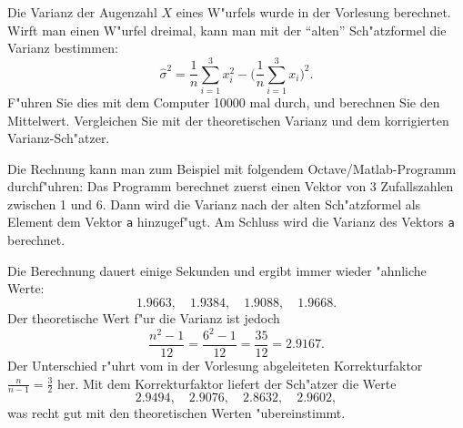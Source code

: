 Die Varianz der Augenzahl $X$ eines W"urfels wurde in der Vorlesung
berechnet. Wirft man einen W"urfel dreimal, kann man mit der
``alten'' Sch"atzformel die Varianz bestimmen:
\[
\hat\sigma^2=\frac1n\sum_{i=1}^3x_i^2-\biggl(\frac1n\sum_{i=1}^3x_i\biggr)^2.
\]
F"uhren Sie dies mit dem Computer 10000 mal durch, und berechnen Sie den
Mittelwert. Vergleichen Sie mit der theoretischen Varianz und dem
korrigierten Varianz-Sch"atzer.

\begin{loesung}
Die Rechnung kann man zum Beispiel mit folgendem Octave/Matlab-Programm
durchf"uhren:
Das Programm berechnet zuerst einen Vektor von 3 Zufallszahlen zwischen 1
und 6. Dann wird die Varianz nach der alten Sch"atzformel als Element
dem Vektor {\tt a} hinzugef"ugt. Am Schluss wird die Varianz des Vektors
{\tt a} berechnet.

Die Berechnung dauert einige Sekunden und ergibt immer wieder
"ahnliche Werte:
\[
1.9663,\quad 
1.9384,\quad
1.9088,\quad
1.9668.
\]
Der theoretische Wert f"ur die Varianz ist jedoch
\[
\frac{n^2-1}{12}=\frac{6^2-1}{12}=\frac{35}{12}=2.9167.
\]
Der Unterschied r"uhrt vom in der Vorlesung abgeleiteten Korrekturfaktor
$\frac{n}{n-1}=\frac32$ her. Mit dem Korrekturfaktor liefert der Sch"atzer die
Werte
\[
2.9494,\quad 
2.9076,\quad
2.8632,\quad
2.9602,
\]
was recht gut mit den theoretischen Werten "ubereinstimmt.
\end{loesung}

